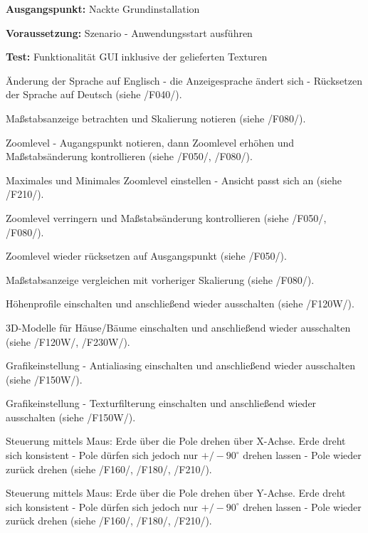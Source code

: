 \documentclass[10pt]{scrreprt}
\newcommand{\sfbf}[1]{\textbf{\sffamily #1}}
\newcommand{\ziel}[1]{{\fontsize{9.5}{11}\textsf{/#1/}}}
\newcommand{\ziellabel}{Z}
\newcommand{\muss}{\renewcommand{\labelenumi}{\textbf{\ziel{\ziellabel\numprint{\theenumi}0}}}}
\newcommand{\wunsch}{\renewcommand{\labelenumi}{\textbf{\ziel{\ziellabel\numprint{\theenumi}0W}}}}
\newenvironment{details}[1][6pt]{%
  \parskip#1 \parindent6mm \raggedright%
  \def\item{\par\ignorespaces\hangindent=5mm \hangafter1}}{%
  \par\ignorespaces}
\begin{document}
\vspace{1.0cm}
\begin{details}[2pt]
\item \sfbf{Ausgangspunkt:} Nackte Grundinstallation 
\item \sfbf{Voraussetzung:} Szenario - Anwendungsstart ausführen
\item \sfbf{Test:} Funktionalität GUI inklusive der gelieferten Texturen 
\end{details}
\vspace{2mm}
\begin{enumerate}[leftmargin = 2.2cm, resume]
\item Änderung der Sprache auf Englisch - die Anzeigesprache ändert sich - Rücksetzen der Sprache auf Deutsch (siehe \ziel{F040}).
\item Maßstabsanzeige betrachten und Skalierung notieren (siehe \ziel{F080}).
\item Zoomlevel - Augangspunkt notieren, dann Zoomlevel erhöhen und Maßstabsänderung kontrollieren (siehe \ziel{F050}, \ziel{F080}).
\item Maximales und Minimales Zoomlevel einstellen - Ansicht passt sich an (siehe \ziel{F210}).
\item Zoomlevel verringern und Maßstabsänderung kontrollieren (siehe \ziel{F050}, \ziel{F080}).
\item Zoomlevel wieder rücksetzen auf Ausgangspunkt (siehe \ziel{F050}).
\item Maßstabsanzeige vergleichen mit vorheriger Skalierung (siehe \ziel{F080}).
\wunsch
\item Höhenprofile einschalten und anschließend wieder ausschalten (siehe \ziel{F120W}).
\item 3D-Modelle für Häuse/Bäume einschalten und anschließend wieder ausschalten (siehe \ziel{F120W}, \ziel{F230W}).
\item Grafikeinstellung - Antialiasing einschalten und anschließend wieder ausschalten (siehe \ziel{F150W}).
\item Grafikeinstellung - Texturfilterung einschalten und anschließend wieder ausschalten (siehe \ziel{F150W}).
\muss
\item Steuerung mittels Maus: Erde über die Pole drehen über X-Achse. Erde dreht sich konsistent - Pole dürfen sich jedoch nur $+/- 90^\circ$ drehen lassen - Pole wieder zurück drehen (siehe \ziel{F160}, \ziel{F180}, \ziel{F210}).
\item Steuerung mittels Maus: Erde über die Pole drehen über Y-Achse. Erde dreht sich konsistent - Pole dürfen sich jedoch nur $+/- 90^\circ$ drehen lassen - Pole wieder zurück drehen (siehe \ziel{F160}, \ziel{F180}, \ziel{F210}).

\end{enumerate}
\end{document}
